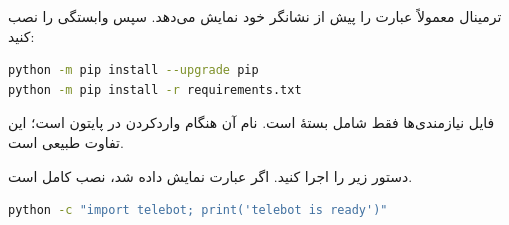 ترمینال معمولاً عبارت
را پیش از نشانگر خود نمایش می‌دهد. سپس وابستگی را نصب کنید:

\begin{LTR}
\begin{lstlisting}[language=bash,numbers=none]
python -m pip install --upgrade pip
python -m pip install -r requirements.txt
\end{lstlisting}
\end{LTR}

فایل نیازمندی‌ها فقط شامل بستهٔ
است. نام آن هنگام واردکردن در پایتون
است؛ این تفاوت طبیعی است.

\begin{checkpointbox}
دستور زیر را اجرا کنید. اگر عبارت
نمایش داده شد، نصب کامل است.
\begin{LTR}
\begin{lstlisting}[language=bash,numbers=none]
python -c "import telebot; print('telebot is ready')"
\end{lstlisting}
\end{LTR}
\end{checkpointbox}
